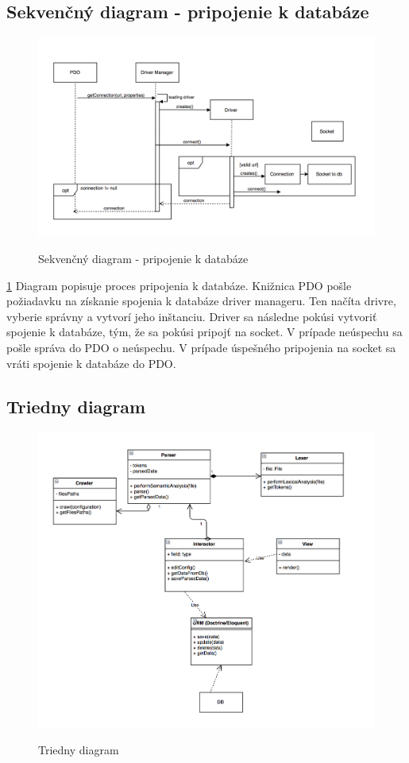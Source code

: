 \documentclass[12pt,a4paper]{article}
\begin{document}
\subsection{Sekvenčný diagram -  pripojenie k databáze}
\begin{figure}[H]
	\caption{Sekvenčný diagram - pripojenie k databáze}
	\includegraphics[width=\textwidth]{db}
	\label{fig:db}
\end{figure}

\ref{fig:db}
Diagram popisuje proces pripojenia k databáze. Knižnica PDO pošle požiadavku na získanie spojenia k databáze driver manageru. Ten načíta drivre, vyberie správny a vytvorí jeho inštanciu. Driver sa následne pokúsi vytvoriť spojenie k databáze, tým, že sa pokúsi pripojť na socket. V prípade neúspechu sa pošle správa do PDO o neúspechu. V prípade úspešného pripojenia na socket sa vráti spojenie k databáze do PDO.

\subsection{Triedny diagram}
\begin{figure}[H]
	\caption{Triedny diagram}
	\includegraphics[width=\textwidth]{class_diagram}
	\label{fig:class_diagram}
\end{figure}
\end{document}
